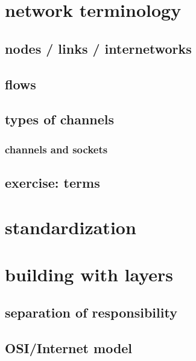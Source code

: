 
\section{network terminology}

\subsection{nodes / links / internetworks}



\subsection{flows}



\subsection{types of channels}



\subsubsection{channels and sockets}


\subsection{exercise: terms}


\section{standardization}


\section{building with layers}

\subsection{separation of responsibility}



\subsection{OSI/Internet model}

